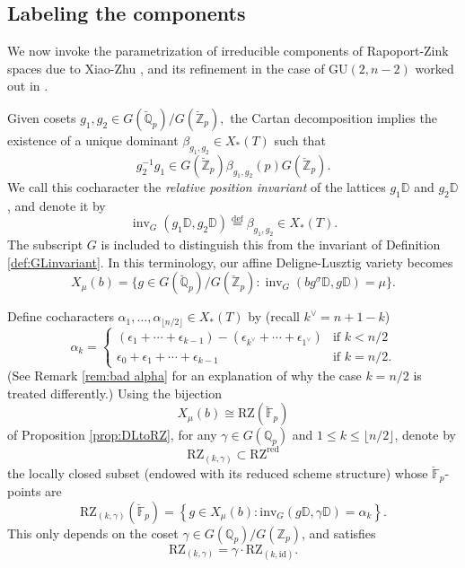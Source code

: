 \documentclass[11pt]{alggeom}
\newcommand{\iso}{\cong}
\newcommand{\define}{\stackrel{\mathrm{def}}{=}}
\newcommand{\red}{\mathrm{red}}
\newcommand{\Q}{\mathbb Q}
\newcommand{\Z}{\mathbb Z}
\newcommand{\F}{\mathbb F}
\DeclareMathOperator{\inv}{inv}
\begin{document}
\subsection{Labeling the   components}




We now invoke the parametrization of irreducible components of Rapoport-Zink spaces due to Xiao-Zhu \cite{XZ}, and its refinement in the case of $\mathrm{GU}(2,n-2)$ worked out in \cite{FI}.





Given cosets 
$
g_1,g_2\in G(\breve{\Q}_p) / G(\breve{\Z}_p),
$
  the Cartan decomposition implies the existence of a unique
dominant $\beta_{g_1,g_2} \in X_*(T)$ such that 
\[
g_2^{-1} g_1 \in G(\breve{\Z}_p) \beta_{g_1,g_2}(p) G(\breve{\Z}_p) .
\]
We call this cocharacter  the \emph{relative position invariant} of the  lattices $g_1\mathbb{D}$ and $g_2\mathbb{D}$, and denote it by
\[
\inv_G(g_1 \mathbb{D}, g_2\mathbb{D})  \define \beta_{g_1,g_2} \in X_*(T) .
\]
The subscript $G$ is included to distinguish this from the invariant  of Definition \ref{def:GLinvariant}.
In this terminology, our affine Deligne-Lusztig variety becomes
\[
X_\mu(b)  = \{ g \in G(\breve{\Q}_p) / G(\breve{\Z}_p) :  \inv_G( b g^\sigma \mathbb{D} , g \mathbb{D}) = \mu  \} .
\]



Define cocharacters
$
\alpha_1,\ldots, \alpha_{ \lfloor n/2\rfloor}  \in X_*(T)
$
 by (recall  $k^\vee =  {n+1-k}$)
\begin{equation}\label{alpha}
\alpha_k = \begin{cases}
 (\epsilon_1+ \cdots +\epsilon_{k-1}) - (\epsilon_{k^\vee}+ \cdots +\epsilon_{1^\vee}) & \mbox{if } k <n/2 \\
 \epsilon_0+\epsilon_1+\cdots+\epsilon_{ k-1} & \mbox{if } k= n/2.
\end{cases}
\end{equation}
(See Remark \ref{rem:bad alpha} for an explanation of why the case $k=n/2$ is treated differently.)
Using the bijection 
\[
X_\mu(b)   \iso \mathrm{RZ}(\breve{\F}_p)
\]
 of Proposition \ref{prop:DLtoRZ}, for any $\gamma \in G(\Q_p)$ and $1\le k \le \lfloor n/2\rfloor$, denote by 
 \[
 \mathrm{RZ}_{(k,\gamma)} \subset \mathrm{RZ}^\red
 \]
the locally closed subset  (endowed with its reduced scheme structure) whose $\breve{\F}_p$-points are
\begin{equation}\label{XZcomponents}
 \mathrm{RZ}_{(k,\gamma)}(\breve{\F}_p) = 
 \left\{ g \in X_\mu(b) :  \mathrm{inv}_G( g \mathbb{D} , \gamma \mathbb{D} ) = \alpha_k \right\} .
\end{equation}
This only depends on the coset $\gamma \in G(\Q_p)/G(\Z_p)$, and satisfies
\begin{equation}\label{translation compatible}
\mathrm{RZ}_{(k,\gamma)}= \gamma \cdot \mathrm{RZ}_{(k,\mathrm{id})} .
\end{equation}
\end{document}
